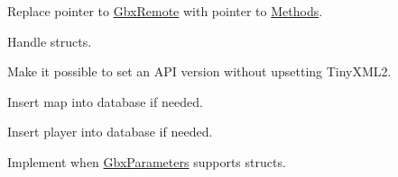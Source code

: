 
\begin{DoxyRefList}
\item[\label{todo__todo000001}%
\hypertarget{todo__todo000001}{}%
Member \hyperlink{classCallBackManager_ab6aeed0451bc44a91651940ded7f892e}{Call\-Back\-Manager\-:\-:Call\-Back\-Manager} (\hyperlink{classGbxRemote}{Gbx\-Remote} $\ast$server\-Ptr, \hyperlink{classEventManager}{Event\-Manager} $\ast$event\-Manager\-Ptr, sql\-::\-Connection $\ast$database\-Ptr, std\-::map$<$ std\-::string, Player $>$ $\ast$player\-List, \hyperlink{classMapList}{Map\-List} $\ast$map\-List)]Replace pointer to \hyperlink{classGbxRemote}{Gbx\-Remote} with pointer to \hyperlink{classMethods}{Methods}. 
\item[\label{todo__todo000003}%
\hypertarget{todo__todo000003}{}%
Class \hyperlink{classGbxParameter}{Gbx\-Parameter} ]Handle structs.  
\item[\label{todo__todo000002}%
\hypertarget{todo__todo000002}{}%
Class \hyperlink{classGbxRemote}{Gbx\-Remote} ]Make it possible to set an A\-P\-I version without upsetting Tiny\-X\-M\-L2.  
\item[\label{todo__todo000005}%
\hypertarget{todo__todo000005}{}%
Member \hyperlink{classManiaPP_a18582fa28b259c22a8a8d526af62123a}{Mania\-P\-P\-:\-:retrieve\-Map\-List} ()]Insert map into database if needed.  
\item[\label{todo__todo000004}%
\hypertarget{todo__todo000004}{}%
Member \hyperlink{classManiaPP_aede94c0b982250de19186d447542e479}{Mania\-P\-P\-:\-:retrieve\-Player\-List} ()]Insert player into database if needed.  
\item[\label{todo__todo000006}%
\hypertarget{todo__todo000006}{}%
Member \hyperlink{classMethods_a0572ff430bc8be89035033fe17d8486a}{Methods\-:\-:Set\-Call\-Vote\-Ratios\-Ex} (bool replace\-All, std\-::vector$<$ Extended\-Call\-Vote\-Ratio $>$ ratios)]Implement when \hyperlink{classGbxParameters}{Gbx\-Parameters} supports structs. 
\end{DoxyRefList}